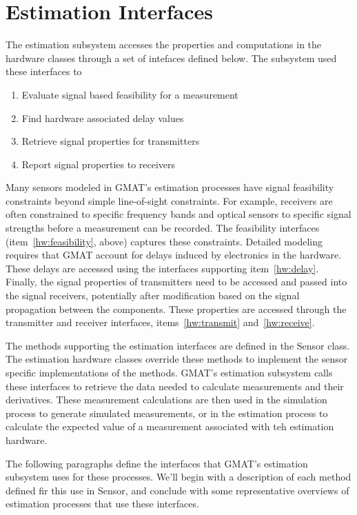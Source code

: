 \section{Estimation Interfaces}

The estimation subsystem accesses the properties and computations in the
hardware classes through a set of intefaces defined below.  The subsystem used
these interfaces to 
\begin{enumerate}
 \item \label{hw:feasibility}Evaluate signal based feasibility for a measurement
 \item \label{hw:delay}Find hardware associated delay values
 \item \label{hw:transmit}Retrieve signal properties for transmitters
 \item \label{hw:receive}Report signal properties to receivers
\end{enumerate}
\noindent
Many sensors modeled in GMAT's estimation processes have signal feasibility
constraints beyond simple line-of-sight constraints.  For example, receivers are
often constrained to specific frequency bands and optical sensors to specific
signal strengths before a measurement can be recorded.  The feasibility
interfaces (item~\ref{hw:feasibility}, above) captures these constraints. 
Detailed modeling requires that GMAT account for delays induced by electronics
in the hardware.  These delays are accessed using the interfaces supporting
item~\ref{hw:delay}.  Finally, the signal properties of transmitters need to be
accessed and passed into the signal receivers, potentially after modification
based on the signal propagation between the components.  These properties are
accessed through the transmitter and receiver interfaces,
items~\ref{hw:transmit} and~\ref{hw:receive}.

The methods supporting the estimation interfaces are defined in the Sensor
class.  The estimation hardware classes override these methods to implement the
sensor specific implementations of the methods.  GMAT's estimation subsystem
calls these interfaces to retrieve the data needed to calculate measurements and
their derivatives.  These measurement calculations are then used in the
simulation process to generate simulated measurements, or in the estimation
process to calculate the expected value of a measurement associated with teh
estimation hardware.

The following paragraphs define the interfaces that GMAT's estimation subsystem
uses for these processes.  We'll begin with a description of each method
defined fir this use in Sensor, and conclude with some representative overviews
of estimation processes that use these interfaces.

